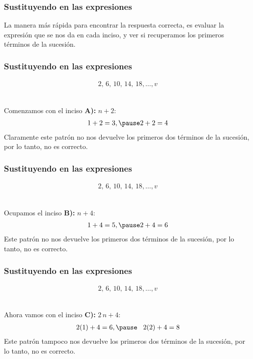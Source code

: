 \begin{frame}
\frametitle{Sustituyendo en las expresiones}
La manera más rápida para encontrar la respuesta correcta, es evaluar la expresión que se nos da en cada inciso, y ver si recuperamos los primeros términos de la sucesión.
\end{frame}
\begin{frame}
\frametitle{Sustituyendo en las expresiones}
\begin{align*}
2, \, 6, \, 10, \, 14, \, 18, \ldots, v
\end{align*}
\pause
\\
\bigskip
Comenzamos con el inciso \textbf{A):} $n + 2$:
\pause
\begin{eqnarray*}
1 + 2 = 3, \pause 2 + 2 = 4 
\end{eqnarray*}
\pause
Claramente este patrón no nos devuelve los primeros dos términos de la sucesión, por lo tanto, no es correcto.
\end{frame}
\begin{frame}
\frametitle{Sustituyendo en las expresiones}
\begin{align*}
2, \, 6, \, 10, \, 14, \, 18, \ldots, v
\end{align*}
\pause
\\
\bigskip
Ocupamos el inciso \textbf{B):} $n + 4$:
\pause
\begin{eqnarray*}
1 + 4 = 5, \pause 2 + 4 = 6 
\end{eqnarray*}
\pause
Este patrón no nos devuelve los primeros dos términos de la sucesión, por lo tanto, no es correcto.
\end{frame}
\begin{frame}
\frametitle{Sustituyendo en las expresiones}
\begin{align*}
2, \, 6, \, 10, \, 14, \, 18, \ldots, v
\end{align*}
\pause
\\
\bigskip
Ahora vamos con el inciso \textbf{C):} $2 \, n + 4$:
\pause
\begin{eqnarray*}
2 (1) + 4 = 6, \pause \hspace{0.3cm} 2(2) + 4 = 8 
\end{eqnarray*}
\pause
Este patrón tampoco nos devuelve los primeros dos términos de la sucesión, por lo tanto, no es correcto.
\end{frame}
